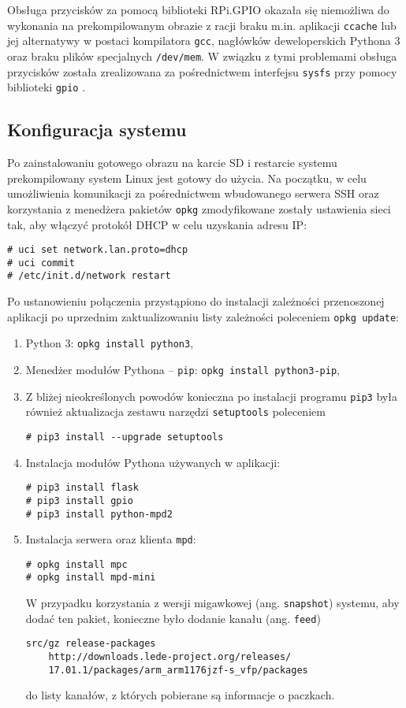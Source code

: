 \documentclass[10pt,a4paper]{article}
\begin{document}
Obsługa przycisków za pomocą biblioteki RPi.GPIO okazała się niemożliwa do wykonania
na prekompilowanym obrazie z racji braku m.in. aplikacji \texttt{ccache} lub jej alternatywy
w postaci kompilatora \texttt{gcc}, nagłówków deweloperskich Pythona 3 oraz braku plików
specjalnych \texttt{/dev/mem}. W związku z tymi problemami obsługa przycisków została zrealizowana
za pośrednictwem interfejsu \texttt{sysfs} przy pomocy biblioteki \texttt{gpio} \cite{gpio}.

\subsection{Konfiguracja systemu}

Po zainstalowaniu gotowego obrazu na karcie SD i restarcie systemu prekompilowany system Linux
jest gotowy do użycia. Na początku, w celu umożliwienia komunikacji za pośrednictwem wbudowanego
serwera SSH oraz korzystania z menedżera pakietów \texttt{opkg} zmodyfikowane zostały ustawienia
sieci tak, aby włączyć protokół DHCP w celu uzyskania adresu IP:

\begin{lstlisting}[caption=Włączanie klienta DHCP na interfejsie \texttt{lan}]
# uci set network.lan.proto=dhcp
# uci commit
# /etc/init.d/network restart
\end{lstlisting}

Po ustanowieniu połączenia przystąpiono do instalacji zależności przenoszonej aplikacji po
uprzednim zaktualizowaniu listy zależności poleceniem \texttt{opkg update}:

\begin{enumerate}
	\item Python 3: \texttt{opkg install python3},
	\item Menedżer modułów Pythona -- \texttt{pip}: \texttt{opkg install python3-pip},
	\item Z bliżej nieokreślonych powodów konieczna po instalacji programu \texttt{pip3}
		była również aktualizacja zestawu narzędzi \texttt{setuptools} poleceniem
\begin{lstlisting}
# pip3 install --upgrade setuptools
\end{lstlisting}
	\item Instalacja modułów Pythona używanych w aplikacji:
\begin{lstlisting}
# pip3 install flask
# pip3 install gpio
# pip3 install python-mpd2
\end{lstlisting}
	\item Instalacja serwera oraz klienta \texttt{mpd}:
\begin{lstlisting}
# opkg install mpc
# opkg install mpd-mini
\end{lstlisting}
		W przypadku korzystania z wersji migawkowej (ang. \texttt{snapshot}) systemu, aby
		dodać ten pakiet, konieczne było dodanie kanału (ang. \texttt{feed})
\begin{lstlisting}
src/gz release-packages 
	http://downloads.lede-project.org/releases/
	17.01.1/packages/arm_arm1176jzf-s_vfp/packages
\end{lstlisting}
		do listy kanałów, z których pobierane są informacje o paczkach.
\end{enumerate}
\end{document}
